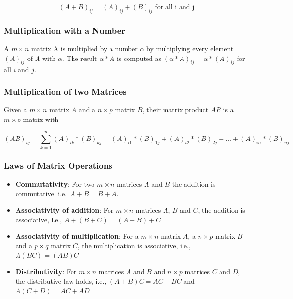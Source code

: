 \documentclass[
]{book}
\providecommand{\tightlist}{%
  \setlength{\itemsep}{0pt}\setlength{\parskip}{0pt}}
\theoremstyle{definition}
\theoremstyle{definition}
\theoremstyle{definition}
\theoremstyle{remark}
\begin{document}
\[(A+B)_{ij} = (A)_{ij} + (B)_{ij} \text{ for all i and j}\]

\hypertarget{intro-linalg-matrix-multiplication-with-number}{%
\subsubsection{Multiplication with a Number}\label{intro-linalg-matrix-multiplication-with-number}}

A \(m\times n\) matrix A is multiplied by a number \(\alpha\) by multiplying every element \((A)_{ij}\) of \(A\) with \(\alpha\). The result \(\alpha * A\) is computed as \((\alpha * A)_{ij} = \alpha * (A)_{ij}\) for all \(i\) and \(j\).

\hypertarget{intro-linalg-multiplication-two-matrices}{%
\subsubsection{Multiplication of two Matrices}\label{intro-linalg-multiplication-two-matrices}}

Given a \(m\times n\) matrix \(A\) and a \(n\times p\) matrix \(B\), their matrix product \(AB\) is a \(m\times p\) matrix with

\[ (AB)_{ij} = \sum_{k=1}^n (A)_{ik} * (B)_{kj} = (A)_{i1} * (B)_{1j} + (A)_{i2} * (B)_{2j} + \ldots + (A)_{in} * (B)_{nj}\]

\hypertarget{intro-linalg-laws-matrix-operations}{%
\subsubsection{Laws of Matrix Operations}\label{intro-linalg-laws-matrix-operations}}

\begin{itemize}
\tightlist
\item
  \textbf{Commutativity}: For two \(m\times n\) matrices \(A\) and \(B\) the addition is commutative, i.e.~\(A + B = B + A\).
\item
  \textbf{Associativity of addition}: For \(m\times n\) matrices \(A\), \(B\) and \(C\), the addition is associative, i.e., \(A + (B + C) = (A + B) + C\)
\item
  \textbf{Associativity of multiplication}: For a \(m\times n\) matrix \(A\), a \(n \times p\) matrix \(B\) and a \(p \times q\) matrix \(C\), the multiplication is associative, i.e., \(A(BC) = (AB)C\)
\item
  \textbf{Distributivity}: For \(m\times n\) matrices \(A\) and \(B\) and \(n\times p\) matrices \(C\) and \(D\), the distributive law holds, i.e., \((A+B)C = AC + BC\) and \(A(C + D) = AC + AD\)
\end{itemize}
\end{document}
